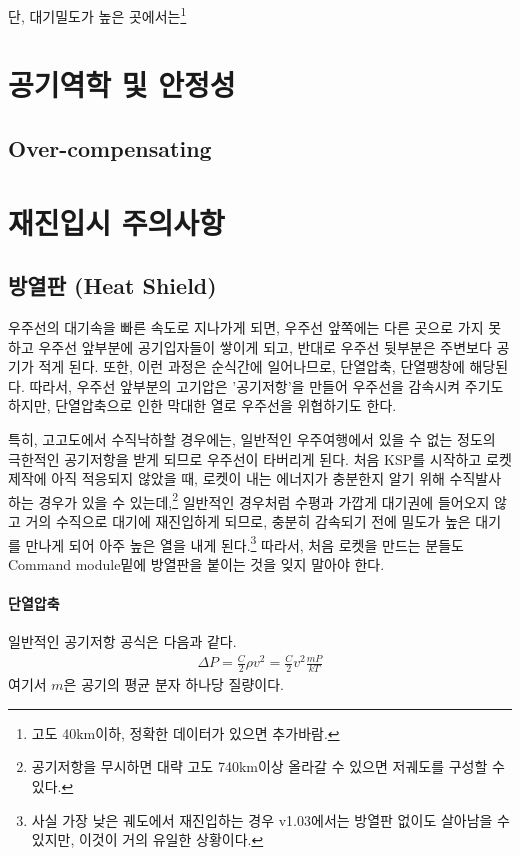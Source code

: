 \documentclass[9pt]{amsbook}
\begin{document}

단, 대기밀도가 높은 곳에서는\footnote{고도 40km이하, 정확한 데이터가 있으면 추가바람.}

\section{공기역학 및 안정성}



\subsection{Over-compensating}
\section{재진입시 주의사항}
\subsection{방열판 (Heat Shield)}
우주선의 대기속을 빠른 속도로 지나가게 되면, 우주선 앞쪽에는 다른 곳으로 가지 못하고 우주선 앞부분에 공기입자들이 쌓이게 되고, 반대로 우주선 뒷부분은 주변보다 공기가 적게 된다. 또한, 이런 과정은 순식간에 일어나므로, 단열압축, 단열팽창에 해당된다. 따라서, 우주선 앞부분의 고기압은 '공기저항'을 만들어 우주선을 감속시켜 주기도 하지만, 단열압축으로 인한 막대한 열로 우주선을 위협하기도 한다.

특히, 고고도에서 수직낙하할 경우에는, 
일반적인 우주여행에서 있을 수 없는 정도의 극한적인 공기저항을 받게 되므로 우주선이 타버리게 된다. 
처음 KSP를 시작하고 로켓제작에 아직 적응되지 않았을 때, 
로켓이 내는 에너지가 충분한지 알기 위해 수직발사 하는 경우가 
있을 수 있는데,\footnote{공기저항을 무시하면 대략 고도 740km이상 올라갈 수 있으면 저궤도를 구성할 수 있다.}
일반적인 경우처럼 수평과 가깝게 대기권에 들어오지 않고 거의 수직으로 대기에 재진입하게 되므로,
충분히 감속되기 전에 밀도가 높은 대기를 만나게 되어 아주 높은 열을 
내게 된다.\footnote{사실 가장 낮은 궤도에서 재진입하는 경우 v1.03에서는 방열판 없이도 살아남을 수 있지만, 
이것이 거의 유일한 상황이다.} 
따라서, 처음 로켓을 만드는 분들도 Command module밑에 방열판을 붙이는 것을 잊지 말아야 한다.

\paragraph{단열압축}
일반적인 공기저항 공식은 다음과 같다.
\begin{align}
\Delta P = \frac{C}{2} \rho v^2 = \frac{C}{2} v^2\frac{m P}{kT}
\end{align}
여기서 $m$은 공기의 평균 분자 하나당 질량이다.
\end{document}
